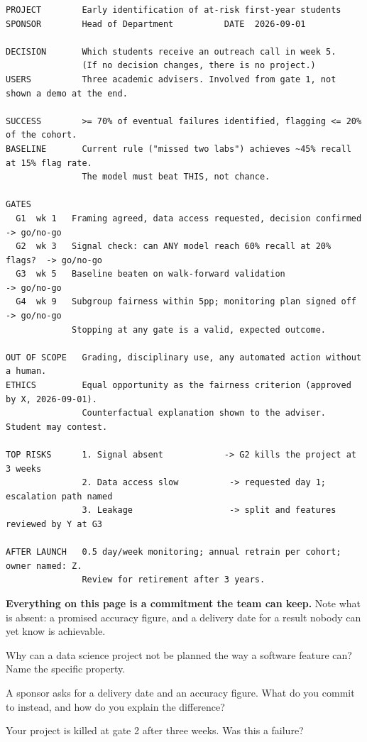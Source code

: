 \begin{lab}
\begin{lstlisting}[basicstyle=\ttfamily\tiny, frame=none, backgroundcolor=\color{codebg}]
PROJECT        Early identification of at-risk first-year students
SPONSOR        Head of Department          DATE  2026-09-01

DECISION       Which students receive an outreach call in week 5.
               (If no decision changes, there is no project.)
USERS          Three academic advisers. Involved from gate 1, not shown a demo at the end.

SUCCESS        >= 70% of eventual failures identified, flagging <= 20% of the cohort.
BASELINE       Current rule ("missed two labs") achieves ~45% recall at 15% flag rate.
               The model must beat THIS, not chance.

GATES
  G1  wk 1   Framing agreed, data access requested, decision confirmed  -> go/no-go
  G2  wk 3   Signal check: can ANY model reach 60% recall at 20% flags?  -> go/no-go
  G3  wk 5   Baseline beaten on walk-forward validation                  -> go/no-go
  G4  wk 9   Subgroup fairness within 5pp; monitoring plan signed off    -> go/no-go
             Stopping at any gate is a valid, expected outcome.

OUT OF SCOPE   Grading, disciplinary use, any automated action without a human.
ETHICS         Equal opportunity as the fairness criterion (approved by X, 2026-09-01).
               Counterfactual explanation shown to the adviser. Student may contest.

TOP RISKS      1. Signal absent            -> G2 kills the project at 3 weeks
               2. Data access slow          -> requested day 1; escalation path named
               3. Leakage                   -> split and features reviewed by Y at G3

AFTER LAUNCH   0.5 day/week monitoring; annual retrain per cohort; owner named: Z.
               Review for retirement after 3 years.
\end{lstlisting}

\textbf{Everything on this page is a commitment the team can keep.} Note what is
absent: a promised accuracy figure, and a delivery date for a result nobody can yet
know is achievable.
\end{lab}

\begin{checkpoint}
\begin{tightnum}
  \item Why can a data science project not be planned the way a software feature
        can? Name the specific property.
  \item A sponsor asks for a delivery date and an accuracy figure. What do you
        commit to instead, and how do you explain the difference?
  \item Your project is killed at gate 2 after three weeks. Was this a failure?
\end{tightnum}
\end{checkpoint}

